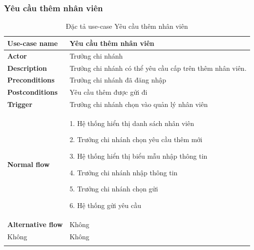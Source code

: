 \subsubsection{Yêu cầu thêm nhân viên}
{
    \setlength\extrarowheight{6pt}
    \begin{longtable}{| p{} | p{} |}
        \hline
        \textbf{Use-case name}
         &
        Yêu cầu thêm nhân viên
        \\
        \hline
        \textbf{Actor}
         &
        Trưởng chi nhánh
        \\
        \hline
        \textbf{Description}
         &
        Trưởng chi nhánh có thể yêu cầu cấp trên thêm nhân viên.
        \\
        \hline
        \textbf{Preconditions}
         &
        Trưởng chi nhánh đã đăng nhập
        \\
        \hline
        \textbf{Postconditions}
         &
        Yêu cầu thêm được gửi đi
        \\
        \hline
        \textbf{Trigger}
         &
        Trưởng chi nhánh chọn vào quản lý nhân viên
        \\
        \hline
        \begin{flushleft}
            \textbf{Normal flow}
        \end{flushleft}
         &
        1. Hệ thống hiển thị danh sách nhân viên

        2. Trưởng chi nhánh chọn yêu cầu thêm mới

        3. Hệ thống hiển thị biểu mẫu nhập thông tin

        4. Trưởng chi nhánh nhập thông tin

        5. Trưởng chi nhánh chọn gửi

        6. Hệ thống gửi yêu cầu
        \\
        \hline
        \textbf{Alternative flow}
         &
        Không
        \\
        \hline
        Không
         &
        Không
        \\
        \hline
        \caption{Đặc tả use-case Yêu cầu thêm nhân viên}
    \end{longtable}
}

